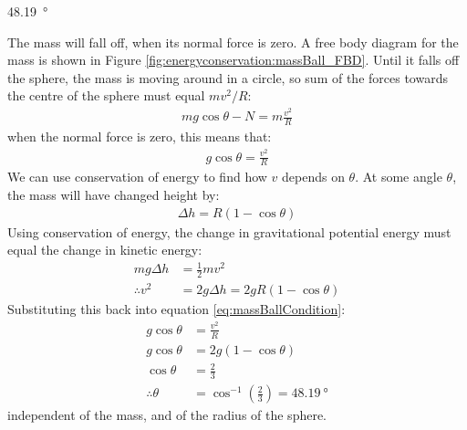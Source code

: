 \begin{finalanswer}
\SI{48.19}{\degree}
\end{finalanswer}
\begin{solution}
The mass will fall off, when its normal force is zero. A free body diagram for the mass is shown in Figure \ref{fig:energyconservation:massBall_FBD}.
Until it falls off the sphere, the mass is moving around in a circle, so sum of the forces towards the centre of the sphere must equal $mv^2/R$:
\begin{align*}
mg\cos\theta-N=m\frac{v^2}{R}
\end{align*}
when the normal force is zero, this means that:
\begin{align}
\label{eq:massBallCondition}
g\cos\theta=\frac{v^2}{R}
\end{align}
We can use conservation of energy to find how $v$ depends on $\theta$. At some angle $\theta$, the mass will have changed height by:
\begin{align*}
\Delta h=R(1-\cos\theta)
\end{align*}
Using conservation of energy, the change in gravitational potential energy must equal the change in kinetic energy:
\begin{align*}
mg\Delta h &= \frac{1}{2}mv^2\\
\therefore v^2 &= 2g\Delta h=2gR(1-\cos\theta)
\end{align*}
Substituting this back into equation \ref{eq:massBallCondition}:
\begin{align*}
g\cos\theta&=\frac{v^2}{R} \\
g\cos\theta&=2g(1-\cos\theta)\\
\cos\theta&=\frac{2}{3}\\
\therefore \theta &= \cos^{-1}\left( \frac{2}{3} \right)=\SI{48.19}{\degree}
\end{align*}
independent of the mass, and of the radius of the sphere.
\end{solution}


